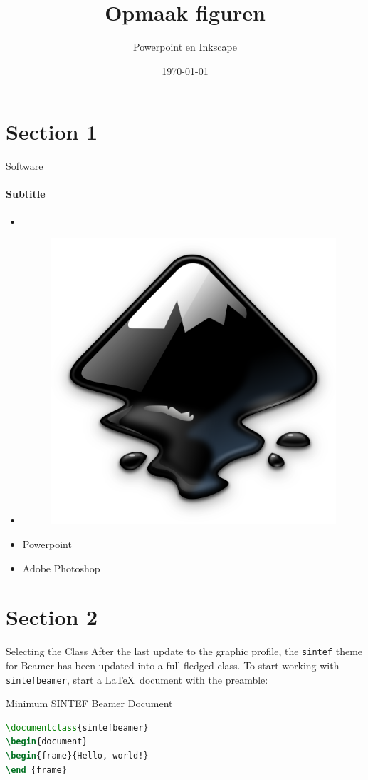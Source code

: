 \documentclass{sintefbeamer}
\title{Opmaak figuren}
\subtitle{Powerpoint en Inkscape}
\author{\href{j.busink@vu.nl}{}}
\date{\today}
\begin{document}
\maketitle





\section{Section 1}



\begin{frame}[fragile]{Software}{\thesection \, \secname}
      \framesubtitle{Subtitle}
      \begin{itemize}
            \item {} 
      \end{itemize}

      \begin{itemize}[<+->]
            \item {}
            \begin{figure}
                  \centering
                  \includegraphics[width = 2 cm]{images/Section 1/Inkscape_Logo.svg.png}
            \end{figure}
            \item Powerpoint
            \item Adobe Photoshop
      \end{itemize}
\end{frame}

\section{Section 2}

\begin{frame}[fragile]{Selecting the Class}
After the last update to the graphic profile, the \texttt{sintef} theme for
Beamer has been updated into a full-fledged class.
To start working with \texttt{sintefbeamer}, start a \LaTeX\ document with the
preamble:
\begin{block}{Minimum SINTEF Beamer Document}
\begin{lstlisting}[language=TeX]
\documentclass{sintefbeamer}
\begin{document}
\begin{frame}{Hello, world!}
\end {frame}
\end{lstlisting}
\end{block}
\end{frame}
\end{document}
